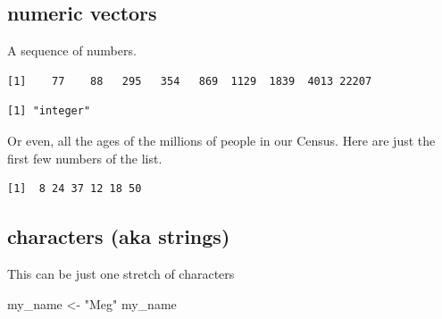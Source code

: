 \documentclass[
  letterpaper,
]{book}
\newenvironment{Shaded}{\begin{snugshade}}{\end{snugshade}}
\newcommand{\FunctionTok}[1]{\textcolor[rgb]{0.28,0.35,0.67}{#1}}
\newcommand{\NormalTok}[1]{\textcolor[rgb]{0.00,0.23,0.31}{#1}}
\newcommand{\OtherTok}[1]{\textcolor[rgb]{0.00,0.23,0.31}{#1}}
\newcommand{\SpecialCharTok}[1]{\textcolor[rgb]{0.37,0.37,0.37}{#1}}
\newcommand{\StringTok}[1]{\textcolor[rgb]{0.13,0.47,0.30}{#1}}
\theoremstyle{definition}
\theoremstyle{definition}
\theoremstyle{plain}
\theoremstyle{definition}
\theoremstyle{plain}
\theoremstyle{plain}
\theoremstyle{remark}
\begin{document}
\hypertarget{numeric-vectors}{%
\subsection{numeric vectors}\label{numeric-vectors}}

A sequence of numbers.

\begin{Shaded}
\end{Shaded}

\begin{verbatim}
[1]    77    88   295   354   869  1129  1839  4013 22207
\end{verbatim}

\begin{Shaded}
\end{Shaded}

\begin{verbatim}
[1] "integer"
\end{verbatim}

Or even, all the ages of the millions of people in our Census. Here are
just the first few numbers of the list.

\begin{Shaded}
\end{Shaded}

\begin{verbatim}
[1]  8 24 37 12 18 50
\end{verbatim}

\hypertarget{characters-aka-strings}{%
\subsection{characters (aka strings)}\label{characters-aka-strings}}

This can be just one stretch of characters

\begin{Shaded}
\begin{Highlighting}[]
\NormalTok{my\_name }\OtherTok{\textless{}{-}} \StringTok{"Meg"}
\NormalTok{my\_name}
\end{Highlighting}
\end{Shaded}
\end{document}
